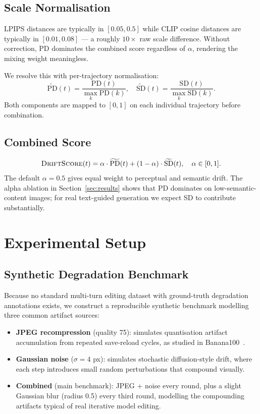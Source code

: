 \documentclass[sigconf]{acmart}
\newcommand{\DS}{\textsc{DriftScore}}
\newcommand{\PD}{\ensuremath{\mathrm{PD}}}
\newcommand{\SD}{\ensuremath{\mathrm{SD}}}
\begin{document}
\subsection{Scale Normalisation}
LPIPS distances are typically in $[0.05, 0.5]$ while CLIP cosine
distances are typically in $[0.01, 0.08]$ --- a roughly $10\times$ raw
scale difference.
Without correction, $\PD$ dominates the combined score regardless of
$\alpha$, rendering the mixing weight meaningless.

We resolve this with per-trajectory normalisation:
\begin{equation}
  \widetilde{\PD}(t) = \frac{\PD(t)}{\max_{k} \PD(k)},
  \quad
  \widetilde{\SD}(t) = \frac{\SD(t)}{\max_{k} \SD(k)}.
  \label{eq:norm}
\end{equation}
Both components are mapped to $[0,1]$ on each individual trajectory
before combination.

\subsection{Combined Score}
\begin{equation}
  \DS(t) = \alpha \cdot \widetilde{\PD}(t)
         + (1 - \alpha) \cdot \widetilde{\SD}(t),
  \quad \alpha \in [0,1].
  \label{eq:combined}
\end{equation}
The default $\alpha = 0.5$ gives equal weight to perceptual and semantic
drift.
The alpha ablation in Section~\ref{sec:results} shows that PD dominates
on low-semantic-content images; for real text-guided generation we expect
SD to contribute substantially.

\section{Experimental Setup}
\label{sec:setup}

\subsection{Synthetic Degradation Benchmark}
Because no standard multi-turn editing dataset with ground-truth
degradation annotations exists, we construct a reproducible synthetic
benchmark modelling three common artifact sources:

\begin{itemize}
  \item \textbf{JPEG recompression} (quality 75): simulates quantisation
    artifact accumulation from repeated save-reload cycles, as studied in
    Banana100~\cite{banana100_2026}.
  \item \textbf{Gaussian noise} ($\sigma = 4$ px): simulates stochastic
    diffusion-style drift, where each step introduces small random
    perturbations that compound visually.
  \item \textbf{Combined} (main benchmark): JPEG + noise every round, plus
    a slight Gaussian blur (radius 0.5) every third round, modelling the
    compounding artifacts typical of real iterative model editing.
\end{itemize}
\end{document}
